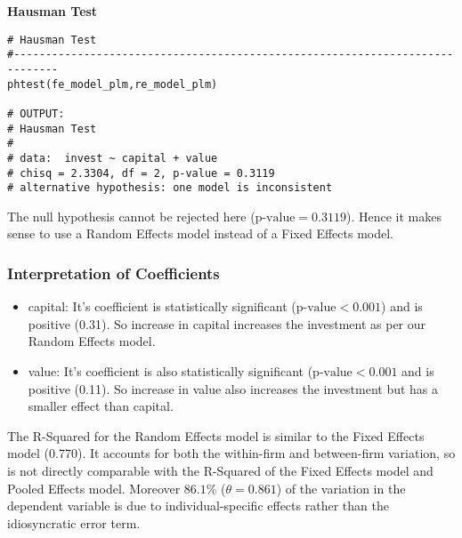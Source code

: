 \documentclass[a4paper]{article}
\begin{document}
\noindent\textbf{Hausman Test}

\begin{lstlisting}[caption={R Code for Hausman Test}]
# Hausman Test
#-----------------------------------------------------------------------------
phtest(fe_model_plm,re_model_plm)

# OUTPUT:
# Hausman Test
# 
# data:  invest ~ capital + value
# chisq = 2.3304, df = 2, p-value = 0.3119
# alternative hypothesis: one model is inconsistent
\end{lstlisting}

The null hypothesis cannot be rejected here (\(\text{p-value} = 0.3119\)). Hence it makes sense to use a Random Effects model instead of a Fixed Effects model.

\subsubsection*{\textbf{Interpretation of Coefficients}}
\begin{itemize}
    \item capital: It's coefficient is statistically significant (\(\text{p-value}<0.001\)) and is positive (0.31). So increase in capital increases the investment as per our Random Effects model.
    \item value: It's coefficient is also statistically significant (\(\text{p-value}<0.001\) and is positive (0.11). So increase in value also increases the investment but has a smaller effect than capital.
\end{itemize}

The R-Squared for the Random Effects model is similar to the Fixed Effects model (0.770). It accounts for both the within-firm and between-firm variation, so is not directly comparable with the R-Squared of the Fixed Effects model and Pooled Effects model. Moreover \(86.1\%\) (\(\theta = 0.861\)) of the variation in the dependent variable is due to individual-specific effects rather than the idiosyncratic error term.
\end{document}
